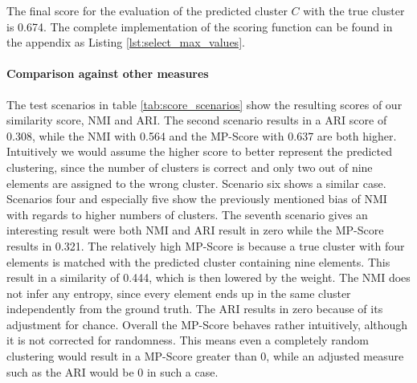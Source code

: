 The final score for the evaluation of the predicted cluster $C$ with the true cluster is 0.674.
The complete implementation of the scoring function can be found in the appendix as Listing \ref{lst:select_max_values}.

\paragraph{Comparison against other measures}
The test scenarios in table \ref{tab:score_scenarios} show the resulting scores of our similarity score, NMI and ARI.
The second scenario results in a ARI score of 0.308, while the NMI with 0.564 and the MP-Score with 0.637 are both higher.
Intuitively we would assume the higher score to better represent the predicted clustering,
since the number of clusters is correct and only two out of nine elements are assigned to the wrong cluster.
Scenario six shows a similar case.
Scenarios four and especially five show the previously mentioned bias of NMI with regards to higher numbers of clusters.
The seventh scenario gives an interesting result were both NMI and ARI result in zero while the MP-Score results in 0.321.
The relatively high MP-Score is because a true cluster with four elements is matched with the predicted cluster containing nine elements.
This result in a similarity of 0.444, which is then lowered by the weight.
The NMI does not infer any entropy, since every element ends up in the same cluster independently from the ground truth.
The ARI results in zero because of its adjustment for chance.
Overall the MP-Score behaves rather intuitively, although it is not corrected for randomness.
This means even a completely random clustering would result in a MP-Score greater than 0,
while an adjusted measure such as the ARI would be 0 in such a case.

